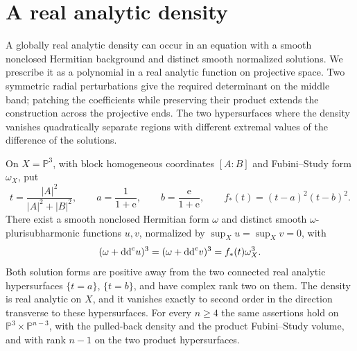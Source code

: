 \section{A real analytic density}
\label{uni-sec:examples}

A globally real analytic density can occur in an equation with a smooth nonclosed Hermitian background and distinct smooth normalized solutions. We prescribe it as a polynomial in a real analytic function on projective space. Two symmetric radial perturbations give the required determinant on the middle band; patching the coefficients while preserving their product extends the construction across the projective ends. The two hypersurfaces where the density vanishes quadratically separate regions with different extremal values of the difference of the solutions.

\begin{theorem}\label{uni-thm:analytic-example}
On $X=\mathbb P^3$, with block homogeneous coordinates $[A:B]$ and Fubini--Study form $\omega_X$, put
\[
 t=\frac{|A|^2}{|A|^2+|B|^2},\qquad
 a=\frac1{1+\mathrm{e}},\qquad b=\frac{\mathrm{e}}{1+\mathrm{e}},\qquad
 f_*(t)=(t-a)^2(t-b)^2.
\]
There exist a
smooth nonclosed Hermitian form $\omega$ and distinct smooth
$\omega$-plurisubharmonic functions $u,v$, normalized by $\sup_Xu=\sup_Xv=0$, with
\begin{equation}\label{uni-eq:analytic-example}
 (\omega+\mathrm{dd}^{\mathrm{c}} u)^3=(\omega+\mathrm{dd}^{\mathrm{c}} v)^3=f_*(t)\omega_X^3.
\end{equation}
Both solution forms are positive away from the two connected real analytic
hypersurfaces $\{t=a\}$, $\{t=b\}$, and have complex rank two on them.
The density is real analytic on $X$, and it vanishes exactly to second order
in the direction transverse to these hypersurfaces.  For every $n\geq4$ the same assertions hold on
$\mathbb{P}^3\times\mathbb{P}^{n-3}$, with the pulled-back density and the product
Fubini--Study volume, and with rank $n-1$ on the two product
hypersurfaces.
\end{theorem}

